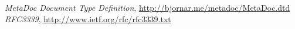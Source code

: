 \newpage
\begin{thebibliography}{99}
     \textit{MetaDoc Document Type Definition}, 
        \url{http://bjornar.me/metadoc/MetaDoc.dtd}
     \textit{RFC3339}, \url{http://www.ietf.org/rfc/rfc3339.txt}
\end{thebibliography}
